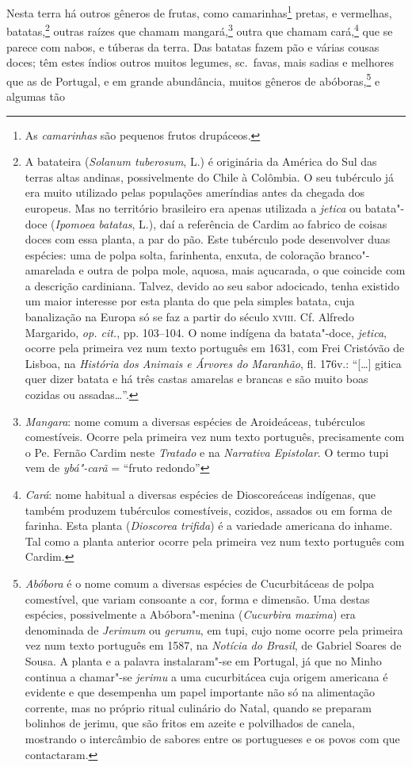  Nesta terra há outros gêneros de frutas, como camarinhas\footnote{ As
\textit{camarinhas} são pequenos frutos drupáceos.} pretas, e
vermelhas, batatas,\footnote{ A batateira (\textit{Solanum tuberosum}, L.) 
é originária da América do Sul das terras altas andinas,
possivelmente do Chile à Colômbia. O seu tubérculo já era muito
utilizado pelas populações ameríndias antes da chegada dos europeus.
Mas no território brasileiro era apenas utilizada a \textit{jetica}
ou batata"-doce (\textit{Ipomoea batatas}, L.), daí a referência de
Cardim ao fabrico de coisas doces com essa planta, a par do pão. Este
tubérculo pode desenvolver duas espécies: uma de polpa solta,
farinhenta, enxuta, de coloração branco"-amarelada e outra de polpa
mole, aquosa, mais açucarada, o que coincide com a descrição
cardiniana. Talvez, devido ao seu sabor adocicado, tenha existido um
maior interesse por esta planta do que pela simples batata, cuja
banalização na Europa só se faz a partir do século \textsc{xviii}. Cf. Alfredo
Margarido, \textit{op. cit.}, pp. 103--104. O nome indígena da
batata"-doce, \textit{jetica}, ocorre pela primeira vez num texto
português em 1631, com Frei Cristóvão de Lisboa, na \textit{História
dos Animais e Árvores do Maranhão}, fl. 176v.: ``[\ldots{}] gitica quer dizer
batata e há três castas amarelas e brancas e são muito boas cozidas ou
assadas\ldots{}''.} outras raízes que chamam mangará,\footnote{ \textit{Mangara}: 
nome comum a diversas espécies de Aroideáceas,
tubérculos comestíveis. Ocorre pela primeira vez num texto português,
precisamente com o Pe. Fernão Cardim neste \textit{Tratado} e na
\textit{Narrativa Epistolar}. O termo tupi vem de \textit{ybá"-carã} = 
``fruto redondo''} outra que chamam cará,\footnote{ \textit{Cará}: nome
habitual a diversas espécies de Dioscoreáceas indígenas, que também
produzem tubérculos comestíveis, cozidos, assados ou em forma de
farinha. Esta planta (\textit{Dioscorea trifida}) é a variedade
americana do inhame. Tal como a planta anterior ocorre pela primeira
vez num texto português com Cardim.} que se parece com nabos, e túberas
da terra. Das batatas fazem pão e várias cousas doces; têm estes índios
outros muitos legumes, sc.~favas, mais sadias e melhores que as de
Portugal, e em grande abundância, muitos gêneros de 
abóboras,\footnote{ \textit{Abóbora} é o nome comum a diversas espécies de
Cucurbitáceas de polpa comestível, que variam consoante a cor, forma e
dimensão. Uma destas espécies, possivelmente a Abóbora"-menina
(\textit{Cucurbira maxima}) era denominada de \textit{Jerimum}
ou \textit{gerumu}, em tupi, cujo nome ocorre pela primeira vez num
texto português em 1587, na \textit{Notícia do Brasil}, de Gabriel
Soares de Sousa. A planta e a palavra instalaram"-se em Portugal, já que
no Minho continua a chamar"-se \textit{jerimu} a uma cucurbitácea cuja
origem americana é evidente e que desempenha um papel importante não só
na alimentação corrente, mas no próprio ritual culinário do Natal,
quando se preparam bolinhos de jerimu, que são fritos em azeite e
polvilhados de canela, mostrando o intercâmbio de sabores entre os
portugueses e os povos com que contactaram.} e algumas tão
